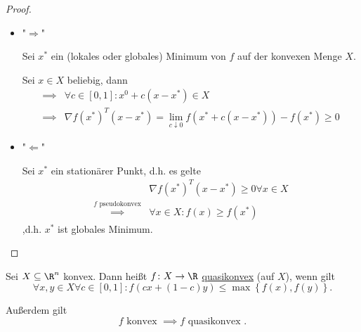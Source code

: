 \begin{proof}\enter
\label{thm:stationäresatzbeweis}
\begin{itemize}[label=]
	\item "$\Rightarrow$"

		Sei ${x}^{*}$ ein (lokales oder globales) Minimum von $f$ auf der konvexen Menge $X$.

Sei $x \in X$ beliebig, dann
\begin{align*}
	\implies &\forall c \in [0,1] \colon x^{0}+c(x-{x}^{*}) \in X \\
	\implies &\nabla f({x}^{*})^{T}(x-{x}^{*}) = \lim\limits_{c\downarrow 0}f({x}^{*}+c(x-{x}^{*}))-f({x}^{*}) \geq 0
\end{align*}

\item "$\Leftarrow$"

	Sei ${x}^{*}$ ein stationärer Punkt, d.h. es gelte
\begin{align*}
	&\nabla f({x}^{*})^{T}(x-{x}^{*}) \geq 0 \forall x \in X \\
	\overset{f \text{ pseudokonvex}}{\implies} &\forall x \in X \colon f(x) \geq f({x}^{*})
\end{align*}
,d.h. ${x}^{*}$ ist globales Minimum.
\end{itemize}
\end{proof}

\begin{definition}
\label{thm:quasikonvex}
Sei $X \subseteq \R^{n}$ konvex. Dann heißt $f \colon X \rightarrow \R $ \underline{quasikonvex} (auf $X$), wenn gilt
\[
	\forall x,y \in X \forall c \in [0,1] \colon f(cx + (1-c)y) \leq \max\limits_{}\left\{ f(x), f(y) \right\} 
.\] 

Außerdem gilt
\[
f \text{ konvex } \implies f \text{ quasikonvex }
.\] 
\end{definition}

